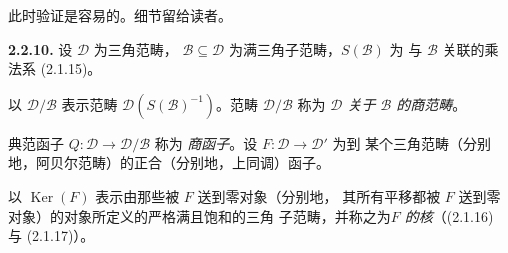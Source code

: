 此时验证是容易的。细节留给读者。

\smallskip
\noindent\textbf{2.2.10.}\quad
设 $\mathcal D$ 为三角范畴，
$\mathcal B\subseteq\mathcal D$ 为满三角子范畴，$S(\mathcal B)$ 为
与 $\mathcal B$ 关联的乘法系 (2.1.15)。

以 $\mathcal D/\mathcal B$ 表示范畴
$\mathcal D(S(\mathcal B)^{-1})$。范畴 $\mathcal D/\mathcal B$ 称为
\emph{$\mathcal D$ 关于 $\mathcal B$ 的商范畴}。

典范函子 $Q\colon\mathcal D\longrightarrow\mathcal D/\mathcal B$ 称为
\emph{商函子}。设 $F\colon\mathcal D\longrightarrow\mathcal D'$ 为到
某个三角范畴（分别地，阿贝尔范畴）的正合（分别地，上同调）函子。

以 $\operatorname{Ker}(F)$ 表示由那些被 $F$ 送到零对象（分别地，
其所有平移都被 $F$ 送到零对象）的对象所定义的严格满且饱和的三角
子范畴，并称之为\emph{$F$ 的核}（(2.1.16) 与 (2.1.17)）。

\endgroup
